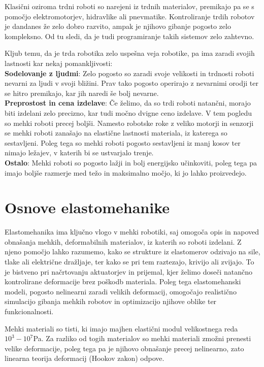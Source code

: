\documentclass[12pt ]{article}
\begin{document}
Klasični oziroma trdni roboti so narejeni iz trdnih materialov, premikajo pa se s pomočjo elektromotorjev, hidravlike ali pnevmatike. Kontroliranje trdih robotov je dandanes že zelo dobro razvito, ampak je njihovo gibanje pogosto zelo kompleksno. Od tu sledi, da je tudi programiranje takih sistemov zelo zahtevno.

Kljub temu, da je trda robotika zelo uspešna veja robotike, pa ima zaradi svojih lastnosti kar nekaj pomankljivosti:\\
\textbf{Sodelovanje z ljudmi}: Zelo pogosto so zaradi svoje velikosti in trdnosti roboti nevarni za ljudi v svoji bližini. Prav tako pogosto operirajo z nevarnimi orodji ter se hitro premikajo, kar jih naredi še bolj nevarne.\\
\textbf{Preprostost in cena izdelave}: Če želimo, da so trdi roboti natančni, morajo biti izdelani zelo precizno, kar tudi močno dvigne ceno izdelave. V tem pogledu so mehki roboti precej boljši. Namesto robotske roke z veliko motorji in senzorji se mehki roboti zanašajo na elastične lastnosti materiala, iz katerega so sestavljeni. Poleg tega so mehki roboti pogosto sestavljeni iz manj kosov ter nimajo ležajev, v katerih bi se ustvarjalo trenje.\\
\textbf{Ostalo}: Mehki roboti so pogosto lažji in bolj energijsko učinkoviti, poleg tega pa imajo boljše razmerje med težo in maksimalno močjo, ki jo lahko proizvedejo\cite{whitesides2018soft}.

\section{Osnove elastomehanike}
Elastomehanika ima ključno vlogo v mehki robotiki, saj omogoča opis in napoved obnašanja mehkih, deformabilnih materialov, iz katerih so roboti izdelani. Z njeno pomočjo lahko razumemo, kako se strukture iz elastomerov odzivajo na sile, tlake ali električne dražljaje, ter kako se pri tem raztezajo, krivijo ali zvijajo. To je bistveno pri načrtovanju aktuatorjev in prijemal, kjer želimo doseči natančno kontrolirane deformacije brez poškodb materiala. Poleg tega elastomehanski modeli, pogosto nelinearni zaradi velikih deformacij, omogočajo realistično simulacijo gibanja mehkih robotov in optimizacijo njihove oblike ter funkcionalnosti.

Mehki materiali so tisti, ki imajo majhen elastični modul velikostnega reda $10^3-10^7$Pa. Za razliko od togih materialov so mehki materiali zmožni prenesti velike deformacije, poleg tega pa je njihovo obnašanje precej nelinearno, zato linearna teorija deformacij (Hookov zakon) odpove.
\end{document}
